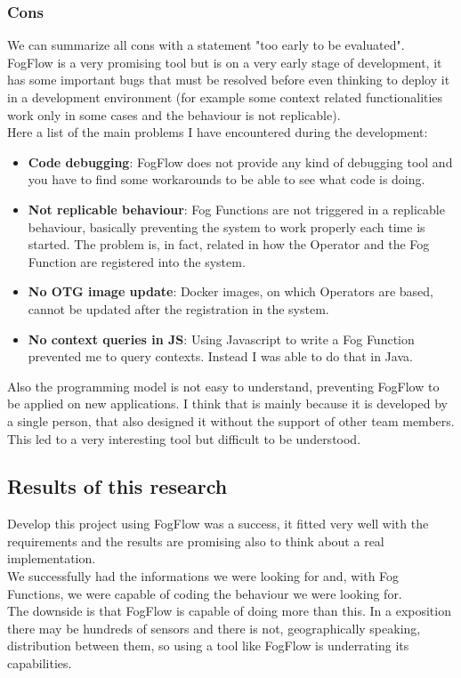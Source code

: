 \documentclass[a4paper]{article}
\begin{document}
\subsubsection{Cons}
We can summarize all cons with a statement "too early to be evaluated".\\
FogFlow is a very promising tool but is on a very early stage of development, it has some important bugs that must be resolved before even thinking to deploy it in a development environment (for example some context related functionalities work only in some cases and the behaviour is not replicable).\\
Here a list of the main problems I have encountered during the development:
\begin{itemize}
    \item \textbf{Code debugging}: FogFlow does not provide any kind of debugging tool and you have to find some workarounds to be able to see what code is doing.
    \item \textbf{Not replicable behaviour}: Fog Functions are not triggered in a replicable behaviour, basically preventing the system to work properly each time is started. The problem is, in fact, related in how the Operator and the Fog Function are registered into the system.
    \item \textbf{No OTG image update}: Docker images, on which Operators are based, cannot be updated after the registration in the system.
    \item \textbf{No context queries in JS}: Using Javascript to write a Fog Function prevented me to query contexts. Instead I was able to do that in Java.
\end{itemize}
Also the programming model is not easy to understand, preventing FogFlow to be applied on new applications. I think that is mainly because it is developed by a single person, that also designed it without the support of other team members. This led to a very interesting tool but difficult to be understood.

\subsection{Results of this research}
Develop this project using FogFlow was a success, it fitted very well with the requirements and the results are promising also to think about a real implementation.\\
We successfully had the informations we were looking for and, with Fog Functions, we were capable of coding the behaviour we were looking for.\\
The downside is that FogFlow is capable of doing more than this. In a exposition there may be hundreds of sensors and there is not, geographically speaking, distribution between them, so using a tool like FogFlow is underrating its capabilities.
\end{document}

